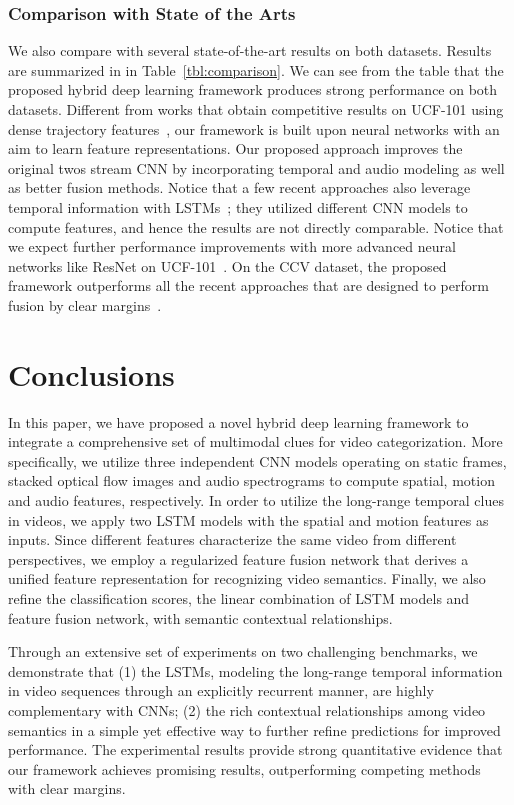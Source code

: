 \documentclass[journal]{IEEEtran}
\begin{document}
\subsubsection{Comparison with State of the Arts}
We also compare with several state-of-the-art results on both datasets. Results are summarized in in Table~\ref{tbl:comparison}. We can see from the table that the proposed hybrid deep learning framework produces strong performance on both datasets. Different from works that obtain competitive results on UCF-101 using dense trajectory features~\cite{wang2013action,Zha2015}, our framework is built upon neural networks with an aim to learn feature representations. Our proposed approach improves the original twos stream CNN by incorporating temporal and audio modeling as well as better fusion methods. Notice that a few recent approaches also leverage temporal information with LSTMs~\cite{Donahue2015,Srivastava2015}; they utilized different CNN models to compute features, and hence the results are not directly comparable. Notice that we expect further performance improvements with more advanced neural networks like ResNet on UCF-101~\cite{Wang2016a,Feichtenhofer2016}.
On the CCV dataset, the proposed framework outperforms all the recent approaches that are designed to perform fusion by clear margins~\cite{xu2013feature,ye2012robust,MVA:audiovisual,DBLP:journals/ijcv/MaY14,liu2013sample,mm14:videoclassification}.

\section{Conclusions}
\label{sec:conclusion}
In this paper, we have proposed a novel hybrid deep learning framework to integrate a comprehensive set of multimodal clues for video categorization. More specifically, we utilize three independent CNN models operating on static frames, stacked optical flow images and audio spectrograms to compute spatial, motion and audio features, respectively. In order to utilize the long-range temporal clues in videos, we apply two LSTM models with the spatial and motion features as inputs. Since different features characterize the same video from different perspectives, we employ a regularized feature fusion network that derives a unified feature representation for recognizing video semantics. Finally, we also refine the classification scores, the linear combination of LSTM models and feature fusion network, with semantic contextual relationships. 

Through an extensive set of experiments on two challenging benchmarks, we demonstrate that (1) the LSTMs, modeling the long-range temporal information in video sequences through an explicitly recurrent manner, are highly complementary with CNNs; (2) the rich contextual relationships among video semantics in a simple yet effective way to further refine predictions for improved performance. The experimental results provide strong quantitative evidence that our framework achieves promising results, outperforming competing methods with clear margins.
\end{document}

